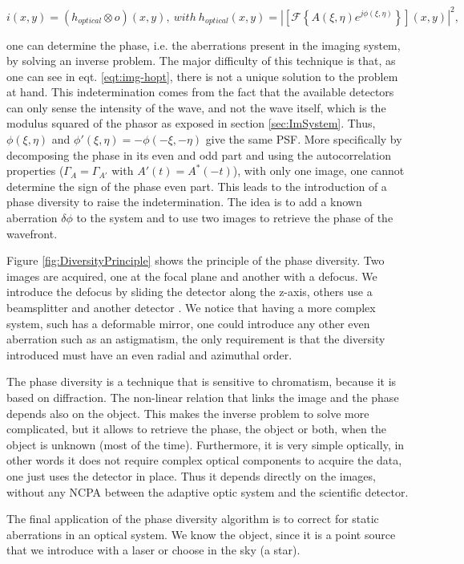 \begin{equation}
i(x,y) = (h_{optical}\otimes o)(x,y), \ with \ h_{optical}(x,y) = |\left[\mathcal{F}\left\lbrace A(\xi,\eta)e^{j\phi(\xi,\eta)} \right\rbrace\right](x,y)|^2,
\label{eqt:img-hopt}
\end{equation}

one can determine the phase, i.e. the aberrations present in the imaging system, by solving an inverse problem. The major difficulty of this technique is that, as one can see in eqt. \eqref{eqt:img-hopt}, there is not a unique solution to the problem at hand. This indetermination comes from the fact that the available detectors can only sense the intensity of the wave, and not the wave itself, which is the modulus squared of the phasor as exposed in section \ref{sec:ImSystem}. Thus, $\phi(\xi,\eta)$ and $\phi'(\xi,\eta)=-\phi(-\xi,-\eta)$ give the same PSF.
More specifically by decomposing the phase in its even and odd part and using the autocorrelation properties ($\Gamma_A = \Gamma_{A'}$ with $A'(t) = A^*(-t)$), with only one image, one cannot determine the sign of the phase even part. This leads to the introduction of a phase diversity to raise the indetermination. The idea is to add a known aberration $\delta\phi$ to the system and to use two images to retrieve the phase of the wavefront.

Figure \ref{fig:DiversityPrinciple} shows the principle of the phase diversity. Two images are acquired, one at the focal plane and another with a defocus. We introduce the defocus by sliding the detector along the z-axis, others use a beamsplitter and another detector \citep{mugnier_2006}. We notice that having a more complex system, such has a deformable mirror, one could introduce any other even aberration such as an astigmatism, the only requirement is that the diversity introduced must have an even radial and azimuthal order.

The phase diversity is a technique that is sensitive to chromatism, because it is based on diffraction. The non-linear relation that links the image and the phase depends also on the object. This makes the inverse problem to solve more complicated, but it allows to retrieve the phase, the object or both, when the object is unknown (most of the time). Furthermore, it is very simple optically, in other words it does not require complex optical components to acquire the data, one just uses the detector in place. Thus it depends directly on the images, without any NCPA between the adaptive optic system and the scientific detector.

The final application of the phase diversity algorithm is to correct for static aberrations in an optical system. We know the object, since it is a point source that we introduce with a laser or choose in the sky (a star).